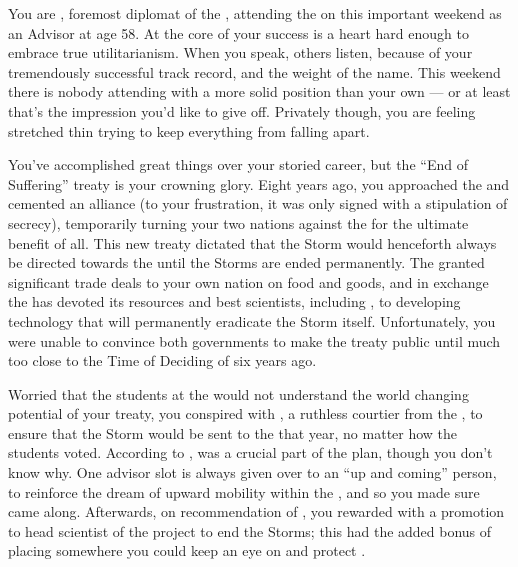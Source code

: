 \documentclass[char]{GL2020}
\begin{document}
\name{\cDiplomat{}}

You are \cDiplomat{\intro}, foremost diplomat of the \pTech{}, attending the \pSchool{} on this important weekend as an Advisor at age 58. At the core of your success is a heart hard enough to embrace true utilitarianism. When you speak, others listen, because of your tremendously successful track record, and the weight of the \cDiplomat{\formal} name. This weekend there is nobody attending with a more solid position than your own — or at least that's the impression you'd like to give off. Privately though, you are feeling stretched thin trying to keep everything from falling apart. 

You've accomplished great things over your storied career, but the “End of Suffering” treaty is your crowning glory. Eight years ago, you approached the \pFarm{} and cemented an alliance (to your frustration, it was only signed with a stipulation of secrecy), temporarily turning your two nations against the \pShip{} for the ultimate benefit of all. This new treaty dictated that the Storm would henceforth always be directed towards the \pShip{} until the Storms are ended permanently. The \pFarm{} granted significant trade deals to your own nation on food and goods, and in exchange the \pTech{} has devoted its resources and best scientists, including \cHeadScientist{\full}, to developing technology that will permanently eradicate the Storm itself. Unfortunately, you were unable to convince both governments to make the treaty public until much too close to the Time of Deciding of six years ago.

Worried that the students at the \pSchool{} would not understand the world changing potential of your treaty, you conspired with \cEvil{\full}, a ruthless courtier from the \pFarm{}, to ensure that the Storm would be sent to the \pShip{} that year, no matter how the students voted. According to \cEvil{}, \cHeadScientist{\full} was a crucial part of the plan, though you don’t know why. One advisor slot is always given over to an ``up and coming'' person, to reinforce the dream of upward mobility within the \pTech{}, and so you made sure \cHeadScientist{} came along. Afterwards, on recommendation of \cEvil{}, you rewarded \cHeadScientist{} with a promotion to head scientist of the project to end the Storms; this had the added bonus of placing \cHeadScientist{\them} somewhere you could keep an eye on and protect \cHeadScientist{\them}.
\end{document}

